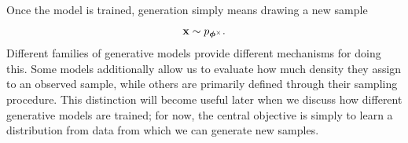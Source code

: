 Once the model is trained, generation simply means drawing a new sample
\[
    {\mathbf{x}} \sim p_{\bm{\phi}^{\times}}.
\]
Different families of generative models provide different mechanisms for doing
this.
Some models additionally allow us to evaluate how much density they assign to
an observed sample, while others are primarily defined through their sampling
procedure.
This distinction will become useful later when we discuss how different
generative models are trained; for now, the central objective is simply to
learn a distribution from data from which we can generate new samples.








